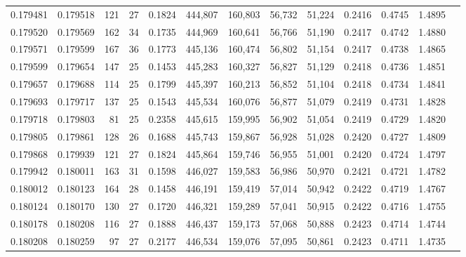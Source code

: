 \begin{tabular}{rrrrrrrrrrrrr}
0.179481 & 0.179518 & 121 &  27 &                                     0.1824 & 444,807 & 160,803 &  56,732 &  51,224 & 0.2416 & 0.4745 & 1.4895 \\
0.179520 & 0.179569 & 162 &  34 &                                     0.1735 & 444,969 & 160,641 &  56,766 &  51,190 & 0.2417 & 0.4742 & 1.4880 \\
0.179571 & 0.179599 & 167 &  36 &                                     0.1773 & 445,136 & 160,474 &  56,802 &  51,154 & 0.2417 & 0.4738 & 1.4865 \\
0.179599 & 0.179654 & 147 &  25 &                                     0.1453 & 445,283 & 160,327 &  56,827 &  51,129 & 0.2418 & 0.4736 & 1.4851 \\
0.179657 & 0.179688 & 114 &  25 &                                     0.1799 & 445,397 & 160,213 &  56,852 &  51,104 & 0.2418 & 0.4734 & 1.4841 \\
0.179693 & 0.179717 & 137 &  25 &                                     0.1543 & 445,534 & 160,076 &  56,877 &  51,079 & 0.2419 & 0.4731 & 1.4828 \\
0.179718 & 0.179803 &  81 &  25 &                                     0.2358 & 445,615 & 159,995 &  56,902 &  51,054 & 0.2419 & 0.4729 & 1.4820 \\
0.179805 & 0.179861 & 128 &  26 &                                     0.1688 & 445,743 & 159,867 &  56,928 &  51,028 & 0.2420 & 0.4727 & 1.4809 \\
0.179868 & 0.179939 & 121 &  27 &                                     0.1824 & 445,864 & 159,746 &  56,955 &  51,001 & 0.2420 & 0.4724 & 1.4797 \\
0.179942 & 0.180011 & 163 &  31 &                                     0.1598 & 446,027 & 159,583 &  56,986 &  50,970 & 0.2421 & 0.4721 & 1.4782 \\
0.180012 & 0.180123 & 164 &  28 &                                     0.1458 & 446,191 & 159,419 &  57,014 &  50,942 & 0.2422 & 0.4719 & 1.4767 \\
0.180124 & 0.180170 & 130 &  27 &                                     0.1720 & 446,321 & 159,289 &  57,041 &  50,915 & 0.2422 & 0.4716 & 1.4755 \\
0.180178 & 0.180208 & 116 &  27 &                                     0.1888 & 446,437 & 159,173 &  57,068 &  50,888 & 0.2423 & 0.4714 & 1.4744 \\
0.180208 & 0.180259 &  97 &  27 &                                     0.2177 & 446,534 & 159,076 &  57,095 &  50,861 & 0.2423 & 0.4711 & 1.4735 \\

\end{tabular}
